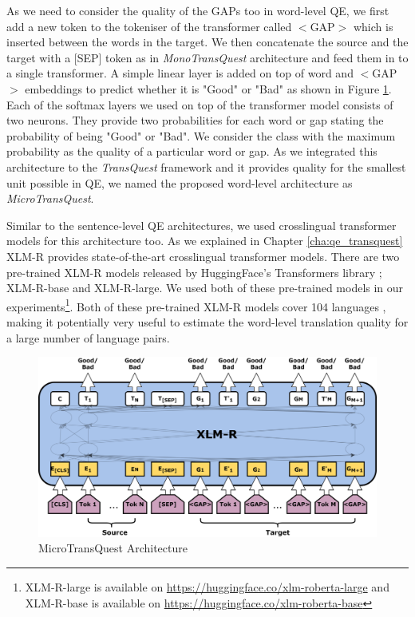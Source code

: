 As we need to consider the quality of the GAPs too in word-level QE, we first add a new token to the tokeniser of the transformer called \textsc{$<$GAP$>$} which is inserted between the words in the target. We then concatenate the source and the target with a \textsc{[SEP]} token as in \textit{MonoTransQuest} architecture and feed them in to a single transformer. A simple linear layer is added on top of word and {$<$GAP$>$} embeddings to predict whether it is "Good" or "Bad" as shown in Figure \ref{fig:word_level_architecture}. Each of the softmax layers we used on top of the transformer model consists of two neurons. They provide two probabilities for each word or gap stating the probability of being "Good" or "Bad". We consider the class with the maximum probability as the quality of a particular word or gap. As we integrated this architecture to the \textit{TransQuest} framework and it provides quality for the smallest unit possible in QE, we named the proposed word-level architecture as \textit{MicroTransQuest}. 


Similar to the sentence-level QE architectures, we used crosslingual transformer models for this architecture too. As we explained in Chapter \ref{cha:qe_transquest} XLM-R provides state-of-the-art crosslingual transformer models. There are two pre-trained XLM-R models released by HuggingFace's Transformers library \autocite{wolf-etal-2020-transformers}; XLM-R-base and XLM-R-large. We used both of these pre-trained models in our experiments\footnote{XLM-R-large is available on \url{https://huggingface.co/xlm-roberta-large} and XLM-R-base is available on \url{https://huggingface.co/xlm-roberta-base}}. Both of these pre-trained XLM-R models cover 104 languages \autocite{conneau-etal-2020-unsupervised}, making it potentially very useful to estimate the word-level translation quality for a large number of language pairs.

\begin{figure}
	\centering
	\includegraphics[scale=0.7]{figures/translation_quality_estimation/word_level/MicroTransQuest.png}
	\caption{MicroTransQuest Architecture}
	\label{fig:word_level_architecture}
\end{figure}

